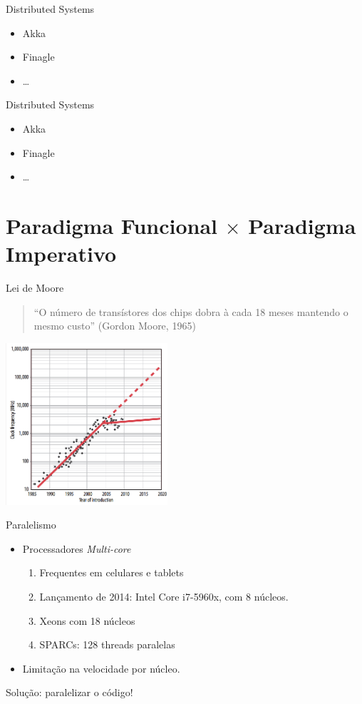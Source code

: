 \documentclass[12pt]{beamer}
\begin{document}
\begin{frame}{Distributed Systems}
\begin{itemize}
\item Akka
\item Finagle 
\item \dots
\end{itemize}
\end{frame}

\begin{frame}{Distributed Systems}
\begin{itemize}
\item Akka
\item Finagle 
\item \dots
\end{itemize}
\end{frame}

\section{Paradigma Funcional $\times$ Paradigma Imperativo} 

\begin{frame}{Lei de Moore}

\begin{quote}
``O número de transístores dos chips dobra à cada 18 meses mantendo o mesmo custo'' (Gordon Moore, 1965)
\end{quote}

\pause

\begin{center}
\includegraphics[height=6cm]{cpu_speed.png}
\end{center}

\end{frame}

\begin{frame}{Paralelismo}
\begin{itemize}
\item Processadores \emph{Multi-core}
\pause
\begin{enumerate}
        \item Frequentes em celulares e tablets
        \item Lançamento de 2014: Intel Core i7-5960x,
              com 8 núcleos.
        \item Xeons com 18 núcleos
        \item SPARCs: 128 threads paralelas
\end{enumerate}
\pause
\item Limitação na velocidade por núcleo.
\end{itemize}
\pause
Solução: paralelizar o código!
\end{frame}
\end{document}
